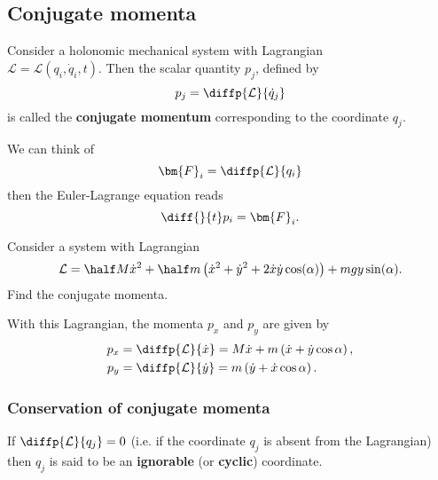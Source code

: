 \documentclass[12pt, a4paper]{article}
\newcommand{\LL}{\mathcal L}
\begin{document}
\subsection{Conjugate momenta}

\begin{definition}
    Consider a holonomic mechanical system with Lagrangian \\ \(\mathcal{L}=\mathcal{L}(q_i,\dot{q}_i,t)\). Then the scalar quantity \(p_j\), defined by 
    \[p_j = \diffp{\mathcal{L}}{{\dot{q}_j}}\]
    is called the \textbf{conjugate momentum} corresponding to the coordinate \(q_j\). 
\end{definition}

\begin{mdremark}
    We can think of 
    \[\bm{F}_i=\diffp{\LL}{{q_i}}\]
    then the Euler-Lagrange equation reads 
    \[\diff{}{t}p_i = \bm{F}_i.\]
\end{mdremark}

\begin{mdexample}
    Consider a system with Lagrangian
    \[\mathcal{L}=\half M \dot{x}^2+\half m \left( \dot{x}^2 +\dot{y}^2 +2\dot{x}\dot{y} \cos(\alpha) \right) +mg y \sin(\alpha).\]
    Find the conjugate momenta.
    \begin{solution}
        With this Lagrangian, the momenta \(p_x\) and \(p_y\) are given by 
        \[\begin{aligned}
            p_x &= \diffp{\mathcal{L}}{{\dot{x}}} = M\dot{x}+m\left( \dot{x}+\dot{y} \cos\alpha \right), \\
            p_y &= \diffp{\mathcal{L}}{{\dot{y}}} = m\left( \dot{y}+\dot{x}\cos\alpha\right).
        \end{aligned}\]
    \end{solution}
\end{mdexample}

\subsubsection{Conservation of conjugate momenta}


\begin{definition}
    If \(\diffp{\mathcal{L}}{{q_j}} = 0\) (i.e. if the coordinate \(q_j\) is absent from the Lagrangian) then \(q_j\) is said to be an \textbf{ignorable} (or \textbf{cyclic}) coordinate.
\end{definition}
\end{document}
